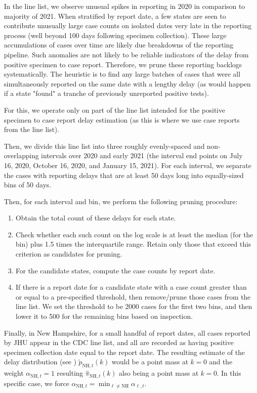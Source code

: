 In the line list, we observe unusual spikes in reporting in 2020
in comparison to majority of 2021. When stratified by report date, a few states are seen to
contribute unusually large case counts on isolated dates very late in the
reporting process (well beyond 100 days following specimen collection). These
large accumulations of cases over time are likely due breakdowns of the
reporting pipeline. Such anomalies are not likely to be reliable indicators of
the delay from positive specimen to case report. Therefore, we prune these
reporting backlogs systematically. The heuristic is to find any large batches of
cases that were all simultaneously reported on the same date with a lengthy
delay (as would happen if a state "found" a tranche of previously unreported
positive tests).

For this, we operate only on part of the line list intended for the positive specimen to
case report delay estimation (as this is where we use case reports from the line list).
 
Then, we divide this line list into three roughly evenly-spaced and 
non-overlapping intervals over 2020 and early 2021
(the interval end points on July 16, 2020, October 16, 2020, and January 15, 2021). 
For each interval, we 
separate the cases with reporting delays that are at least 50 days long into 
equally-sized bins of 50 days.

Then, for each interval and bin, we perform the following pruning procedure:
\begin{enumerate}
\item Obtain the total count of these delays for each state. 
\item Check whether each such count on the log scale is at
least the median (for the bin) plus 1.5 times the interquartile range. Retain
only those that exceed this criterion as candidates for pruning. 
\item For the candidate states, compute the case counts by report date. 
\item If there is a report date for a candidate state with a case count greater 
than or equal to a pre-specified threshold, then remove/prune those cases from the line list. 
We set the threshold to be 2000 cases for the first two bins, and then lower
it to 500 for the remaining bins based on inspection.
\end{enumerate}

Finally, in New Hampshire, for a small handful of report dates, all cases
reported by JHU appear in the CDC line list, and all are recorded as having
positive specimen collection date equal to the report date. The resulting
estimate of the delay distribution (see )
$\widetilde{p}_{\textrm{NH},t}(k)$ would be a point mass at $k=0$ and the weight
$\alpha_{\textrm{NH},t}=1$ resulting $\widehat\pi_{\textrm{NH},t}(k)$ also being a
point mass at $k=0$. In this specific case, we force $\alpha_{\textrm{NH},t} =
\min_{\ell\neq\textrm{NH}} \alpha_{\ell,t}$.

